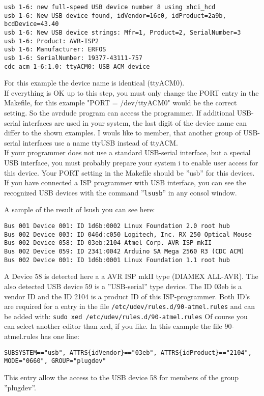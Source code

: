 \begin{verbatim}
usb 1-6: new full-speed USB device number 8 using xhci_hcd
usb 1-6: New USB device found, idVendor=16c0, idProduct=2a9b, bcdDevice=43.40
usb 1-6: New USB device strings: Mfr=1, Product=2, SerialNumber=3
usb 1-6: Product: AVR-ISP2
usb 1-6: Manufacturer: ERFOS
usb 1-6: SerialNumber: 19377-43111-757
cdc_acm 1-6:1.0: ttyACM0: USB ACM device
\end{verbatim}

For this example the device name is identical (ttyACM0).\\

If everything is OK up to this step, you must only change the PORT entry in the Makefile,
for this example "PORT = /dev/ttyACM0" would be the correct setting.
So the avrdude program can access the programmer.
If additional USB-serial interfaces are used in your system,
the last digit of the device name can differ to the shown examples.
I wouls like to member, that another group of USB-serial interfaces
use a name ttyUSB instead of ttyACM.\\

If your programmer does not use a standard USB-serial interface,
but a special USB interface,
you must probably prepare your system i to enable user access for this device.
Your PORT setting in the Makefile should be ''usb'' for this devices.
If you have connected a ISP programmer with USB interface,
you can see the recognized USB devices with the command ''\verb"lsusb"''
in any consol window.

A sample of the result of lsusb you can see here:
\begin{verbatim}
Bus 001 Device 001: ID 1d6b:0002 Linux Foundation 2.0 root hub
Bus 002 Device 003: ID 046d:c050 Logitech, Inc. RX 250 Optical Mouse
Bus 002 Device 058: ID 03eb:2104 Atmel Corp. AVR ISP mkII
Bus 002 Device 059: ID 2341:0042 Arduino SA Mega 2560 R3 (CDC ACM)
Bus 002 Device 001: ID 1d6b:0001 Linux Foundation 1.1 root hub
\end{verbatim}
A Device 58 is detected here a a AVR ISP mkII type (DIAMEX ALL-AVR).
The also detected USB device 59 is a ''USB-serial'' type device.
The ID 03eb is a vendor ID and the ID 2104 is a product ID of this ISP-programmer.
Both ID's are required for a entry in the file \verb"/etc/udev/rules.d/90-atmel.rules"
and can be added with:
\large{\newline\verb"sudo xed /etc/udev/rules.d/90-atmel.rules"\newline}
Of course you can select another editor than xed, if you like.
In this example the file 90-atmel.rules has one line:
\begin{footnotesize}
\begin{verbatim}
SUBSYSTEM=="usb", ATTRS{idVendor}=="03eb", ATTRS{idProduct}=="2104", MODE="0660", GROUP="plugdev"
\end{verbatim}
\end{footnotesize}
This entry allow the access to the USB device 58 for members of the group ''plugdev''.

